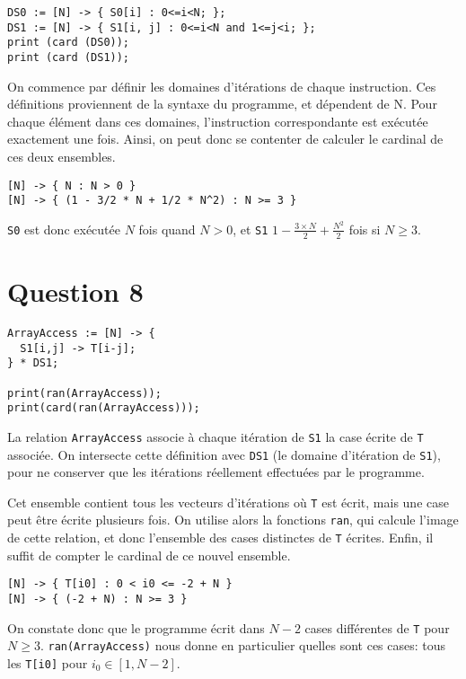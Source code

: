 \documentclass{article}
\begin{document}
\begin{lstlisting}
DS0 := [N] -> { S0[i] : 0<=i<N; };
DS1 := [N] -> { S1[i, j] : 0<=i<N and 1<=j<i; };
print (card (DS0));
print (card (DS1));
\end{lstlisting}

On commence par définir les domaines d'itérations de chaque instruction. Ces définitions proviennent de la syntaxe du programme, et dépendent de N.
Pour chaque élément dans ces domaines, l'instruction correspondante est exécutée exactement une fois.
Ainsi, on peut donc se contenter de calculer le cardinal de ces deux ensembles.

\begin{lstlisting}
[N] -> { N : N > 0 }
[N] -> { (1 - 3/2 * N + 1/2 * N^2) : N >= 3 }
\end{lstlisting}

\lstinline{S0} est donc exécutée $N$ fois quand $N>0$, et \lstinline{S1} $1-\frac{3\times N}{2} + \frac{N^2}{2}$ fois si $N\geq 3$.

\section*{Question 8}
\begin{lstlisting}
ArrayAccess := [N] -> {
  S1[i,j] -> T[i-j];
} * DS1;

print(ran(ArrayAccess));
print(card(ran(ArrayAccess)));
\end{lstlisting}

La relation \lstinline{ArrayAccess} associe à chaque itération de \lstinline{S1} la case écrite de \lstinline{T} associée.
On intersecte cette définition avec \lstinline{DS1} (le domaine d'itération de \lstinline{S1}), pour ne conserver que les itérations réellement effectuées par le programme.

Cet ensemble contient tous les vecteurs d'itérations où \lstinline{T} est écrit, mais une case peut être écrite plusieurs fois. On utilise alors la fonctions \lstinline{ran}, qui calcule l'image de cette relation, et donc l'ensemble des cases distinctes de \lstinline{T} écrites.
Enfin, il suffit de compter le cardinal de ce nouvel ensemble.

\begin{lstlisting}
[N] -> { T[i0] : 0 < i0 <= -2 + N }
[N] -> { (-2 + N) : N >= 3 }
\end{lstlisting}

On constate donc que le programme écrit dans $N-2$ cases différentes de \lstinline{T} pour $N\geq 3$.
\lstinline{ran(ArrayAccess)} nous donne en particulier quelles sont ces cases: tous les \lstinline{T[i0]} pour $i_0\in[1,N-2]$.
\end{document}
